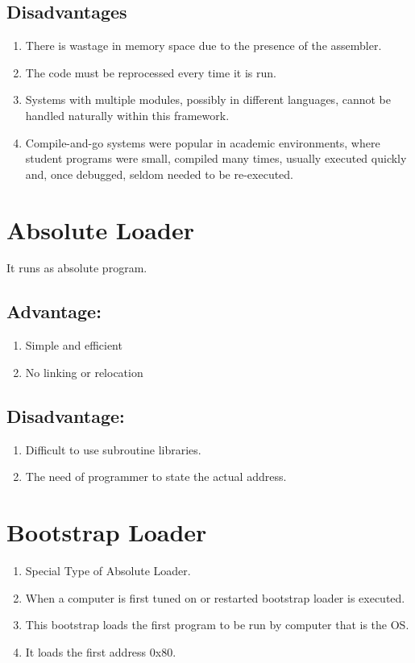 \documentclass{scrreprt}
\begin{document}
\subsection{Disadvantages}
\begin{enumerate}
\item There is wastage in memory space due to the presence of
the assembler.
\item The code must be reprocessed every time it is run.
\item Systems with multiple modules, possibly in different
languages, cannot be handled naturally within this
framework.
\item Compile-and-go systems were popular in academic
environments, where student programs were small,
compiled many times, usually executed quickly and, once
debugged, seldom needed to be re-executed.
\end{enumerate}

\section{Absolute Loader}
It runs as absolute program.
\subsection{Advantage:}
\begin{enumerate}
\item Simple and efficient
\item No linking or relocation
\end{enumerate}

\subsection{Disadvantage:}
\begin{enumerate}
\item Difficult to use subroutine libraries.
\item The need of programmer to state the actual address.
\end{enumerate}

\section{Bootstrap Loader}
\begin{enumerate}
\item Special Type of Absolute Loader.
\item  When a computer is first tuned on or restarted bootstrap
loader is executed.
\item This bootstrap loads the first program to be run by
computer that is the OS.
\item It loads the first address 0x80.
\end{enumerate}
\end{document}
